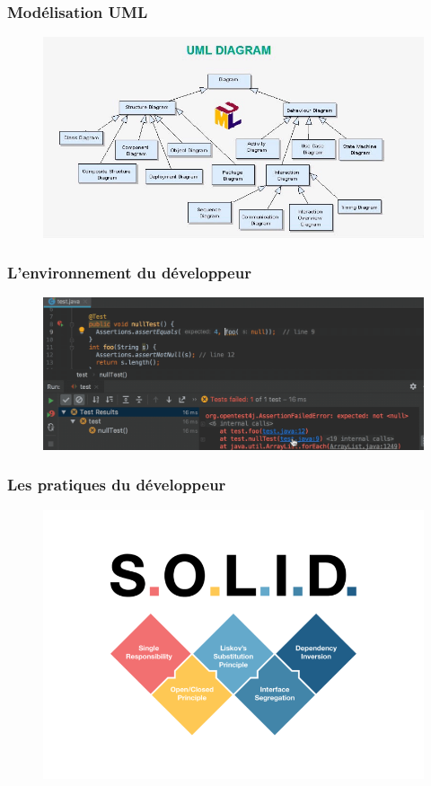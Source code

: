 \begin{frame}
    \frametitle{Modélisation UML}

    \begin{figure}
        \centering
        \includegraphics[height=0.5\linewidth]{figures/introduction/uml}
        \label{fig:uml}
    \end{figure}
\end{frame}

\begin{frame}
    \frametitle{L'environnement du développeur}

    \begin{figure}
        \centering
        \includegraphics[width=\linewidth]{figures/introduction/intellij}
        \label{fig:environnement}
    \end{figure}
\end{frame}

\begin{frame}
    \frametitle{Les pratiques du développeur}

    \begin{figure}
        \centering
        \includegraphics[height=0.5\linewidth]{figures/introduction/solid}
        \label{fig:pratiques}
    \end{figure}
\end{frame}

